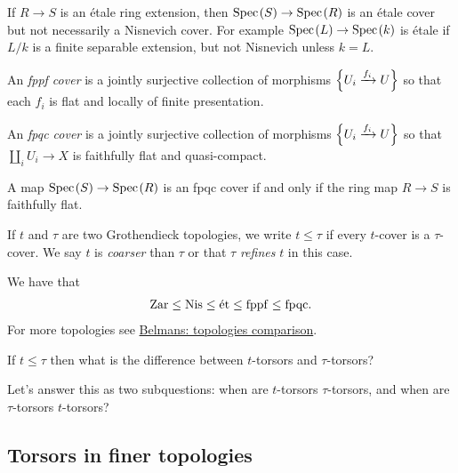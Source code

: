\documentclass[11pt,openany]{book}
\begin{document}
\begin{note} If $R\to S$ is an \'etale ring extension, then $\text{Spec}\hspace{0.1em}(S) \to \text{Spec}\hspace{0.1em}(R)$ is an \'etale cover but not necessarily a Nisnevich cover. For example $\text{Spec}\hspace{0.1em}(L) \to \text{Spec}\hspace{0.1em}(k)$ is \'etale if $L/k$ is a finite separable extension, but not Nisnevich unless $k=L$.
\end{note}

\begin{example} \cite[021M]{Stacks} An \textit{fppf cover} is a jointly surjective collection of morphisms $\left\{ U_i \xrightarrow{f_i} U \right\}$ so that each $f_i$ is flat and locally of finite presentation.
\end{example}

\begin{example} \cite[03NW]{Stacks} An \textit{fpqc cover} is a jointly surjective collection of morphisms $\left\{ U_i \xrightarrow{f_i} U \right\}$ so that $\amalg_i U_i \to X$ is faithfully flat and quasi-compact.
\end{example}

\begin{example} A map $\text{Spec}\hspace{0.1em}(S) \to \text{Spec}\hspace{0.1em}(R)$ is an fpqc cover if and only if the ring map $R\to S$ is faithfully flat.
\end{example}



\begin{terminology} If $t$ and $\tau$ are two Grothendieck topologies, we write $t\le \tau$ if every $t$-cover is a $\tau$-cover. We say $t$ is \textit{coarser} than $\tau$ or that $\tau$ \textit{refines} $t$ in this case.
\end{terminology}

\begin{proposition} We have that
\begin{align*}
    \mathrm{Zar} \le \mathrm{Nis} \le \text{\'{e}t} \le \mathrm{fppf} \le \mathrm{fpqc}.
\end{align*}
For more topologies see \href{https://pbelmans.ncag.info/topologies-comparison/}{Belmans: topologies comparison}.
\end{proposition}

\begin{question} If $t \le \tau$ then what is the difference between $t$-torsors and $\tau$-torsors?
\end{question}

Let's answer this as two subquestions: when are $t$-torsors $\tau$-torsors, and when are $\tau$-torsors $t$-torsors?


\subsection{Torsors in finer topologies}
\end{document}
